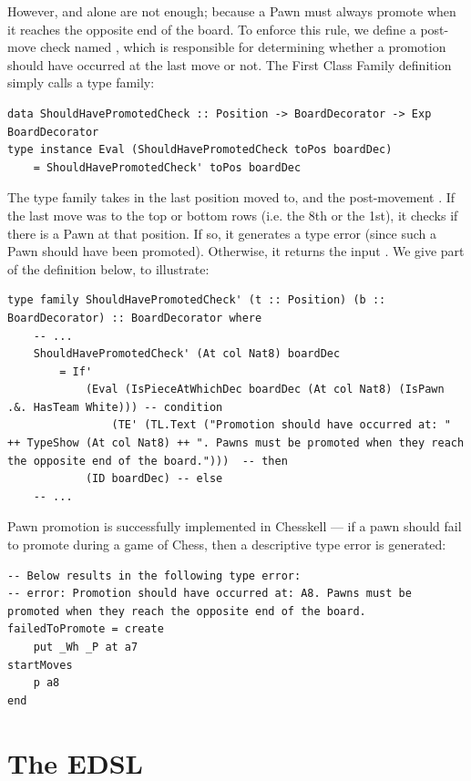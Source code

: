However,  and  alone are not enough; because a Pawn must always promote when it reaches the opposite end of the board. To enforce this rule, we define a post-move check named , which is responsible for determining whether a promotion should have occurred at the last move or not. The First Class Family definition simply calls a type family:

\begin{lstlisting}
data ShouldHavePromotedCheck :: Position -> BoardDecorator -> Exp BoardDecorator
type instance Eval (ShouldHavePromotedCheck toPos boardDec)
    = ShouldHavePromotedCheck' toPos boardDec
\end{lstlisting}

The  type family takes in the last position moved to, and the post-movement . If the last move was to the top or bottom rows (i.e. the 8th or the 1st), it checks if there is a Pawn at that position. If so, it generates a type error (since such a Pawn should have been promoted). Otherwise, it returns the input . We give part of the definition below, to illustrate:

\begin{lstlisting}
type family ShouldHavePromotedCheck' (t :: Position) (b :: BoardDecorator) :: BoardDecorator where
    -- ...
    ShouldHavePromotedCheck' (At col Nat8) boardDec
        = If'
            (Eval (IsPieceAtWhichDec boardDec (At col Nat8) (IsPawn .&. HasTeam White))) -- condition
                (TE' (TL.Text ("Promotion should have occurred at: " ++ TypeShow (At col Nat8) ++ ". Pawns must be promoted when they reach the opposite end of the board.")))  -- then
            (ID boardDec) -- else
    -- ...
\end{lstlisting}

Pawn promotion is successfully implemented in Chesskell --- if a pawn should fail to promote during a game of Chess, then a descriptive type error is generated:

\begin{lstlisting}
-- Below results in the following type error:
-- error: Promotion should have occurred at: A8. Pawns must be promoted when they reach the opposite end of the board.
failedToPromote = create
    put _Wh _P at a7
startMoves
    p a8
end
\end{lstlisting}

\section{The EDSL}

